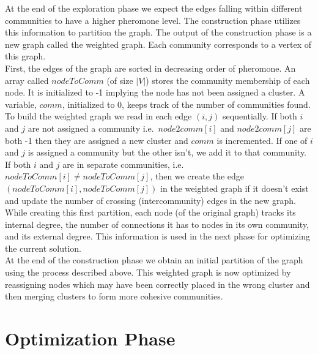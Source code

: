 \begin{spacing}{1.5}
At the end of the exploration phase we expect the edges falling within different communities to have a higher pheromone level. The construction phase utilizes this information to partition the graph. The output of the construction phase is a new graph called the weighted graph. Each community corresponds to a vertex of this graph.\\
\indent First, the edges of the graph are sorted in decreasing order of pheromone. An array called $nodeToComm$ (of size $|V|$) stores the community membership of each node. It is initialized to -1 implying the node has not been assigned a cluster. A variable, $comm$, initialized to 0, keeps track of the number of communities found. \\
\indent To build the weighted graph we read in each edge $(i, j)$ sequentially. If both $i$ and $j$ are not assigned a community i.e.\ $node2comm[i]$ and $node2comm[j]$ are both -1 then they are assigned a new cluster and $comm$ is incremented. If one of $i$ and $j$ is assigned a community but the other isn't, we add it to that community. If both $i$ and $j$ are in separate communities, i.e.\ $nodeToComm[i] \neq nodeToComm[j]$, then we create the edge $(nodeToComm[i], nodeToComm[j])$ in the weighted graph if it doesn't exist and update the number of crossing (intercommunity) edges in the new graph.\\
\indent While creating this first partition, each node (of the original graph) tracks its internal degree, the number of connections it has to nodes in its own community, and its external degree. This information is used in the next phase for optimizing the current solution. \\
\indent At the end of the construction phase we obtain an initial partition of the graph using the process described above. This weighted graph is now optimized by reassigning nodes which may have been correctly placed in the wrong cluster and then merging clusters to form more cohesive communities.\\

\section{Optimization Phase}


\end{spacing}
